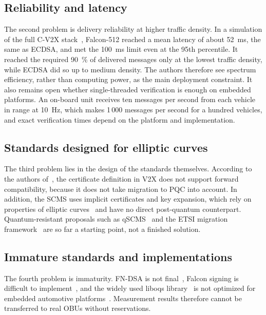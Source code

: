 \documentclass[10pt,twoside,a4paper]{article}
\begin{document}
\subsection{Reliability and latency}

The second problem is delivery reliability at higher traffic density. In a simulation of the full C-V2X stack~\cite{Abrar:2026}, Falcon-512 reached a mean latency of about 52~ms, the same as ECDSA, and met the 100~ms limit even at the 95th percentile. It reached the required 90~\% of delivered messages only at the lowest traffic density, while ECDSA did so up to medium density. The authors therefore see spectrum efficiency, rather than computing power, as the main deployment constraint. It also remains open whether single-threaded verification is enough on embedded platforms. An on-board unit receives ten messages per second from each vehicle in range at 10~Hz, which makes 1\,000 messages per second for a hundred vehicles, and exact verification times depend on the platform and implementation.

\subsection{Standards designed for elliptic curves}

The third problem lies in the design of the standards themselves. According to the authors of~\cite{Yoshizawa:2023}, the certificate definition in V2X does not support forward compatibility, because it does not take migration to PQC into account. In addition, the SCMS uses implicit certificates and key expansion, which rely on properties of elliptic curves~\cite{Whyte:SCMS} and have no direct post-quantum counterpart. Quantum-resistant proposals such as qSCMS~\cite{Barreto:2018} and the ETSI migration framework~\cite{ETSI:TR103619} are so far a starting point, not a finished solution.

\subsection{Immature standards and implementations}

The fourth problem is immaturity. FN-DSA is not final~\cite{NIST:FIPS206}, Falcon signing is difficult to implement~\cite{Fouque:Falcon}, and the widely used liboqs library~\cite{Stebila:2016} is not optimized for embedded automotive platforms~\cite{Abrar:2026}. Measurement results therefore cannot be transferred to real OBUs without reservations.
\end{document}
